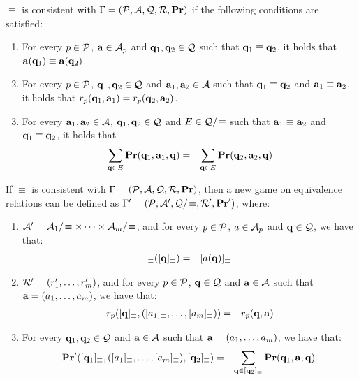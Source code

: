 \documentclass{article}
\begin{document}
\begin{mydef}
$\equiv$ is consistent with $\Gamma = (\mathcal{P},\mathcal{A},\mathcal{Q},\mathcal{R},\mathbf{Pr})$ if the following conditions are satisfied:
\begin{enumerate}
\item For every $p \in \mathcal{P}$, $\mathbf{a} \in \mathcal{A}_p$ and $\mathbf{q}_1, \mathbf{q}_2 \in \mathcal{Q}$ such that $\mathbf{q}_1 \equiv \mathbf{q}_2$, it holds that $\mathbf{a}(\mathbf{q}_1) \equiv \mathbf{a}(\mathbf{q}_2)$.

\item For every $p \in \mathcal{P}$, $\mathbf{q}_1, \mathbf{q}_2 \in \mathcal{Q}$ and $\mathbf{a}_1,\mathbf{a}_2 \in \mathcal{A}$ such that $\mathbf{q}_1 \equiv \mathbf{q}_2$ and  $\mathbf{a}_1 \equiv \mathbf{a}_2$, it holds that $r_p(\mathbf{q}_1, \mathbf{a}_1) = r_p(\mathbf{q}_2, \mathbf{a}_2)$.

\item For every $\mathbf{a}_1,\mathbf{a}_2 \in \mathcal{A}$, $\mathbf{q}_1, \mathbf{q}_2 \in \mathcal{Q}$ and $E \in \mathcal{Q}/\!\equiv$ such that $\mathbf{a}_1 \equiv \mathbf{a}_2$ and $\mathbf{q}_1 \equiv \mathbf{q}_2$, it holds that 
\begin{eqnarray*}
\sum_{\mathbf{q} \in E} \mathbf{Pr}(\mathbf{q}_1, \mathbf{a}_1, \mathbf{q}) & = & \sum_{\mathbf{q} \in E} \mathbf{Pr}(\mathbf{q}_2, \mathbf{a}_2, \mathbf{q})
\end{eqnarray*}

\end{enumerate}
\end{mydef}
If $\equiv$ is consistent with $\Gamma = (\mathcal{P},\mathcal{A},\mathcal{Q},\mathcal{R},\mathbf{Pr})$, then a new game on equivalence relations can be defined as $\Gamma' = (\mathcal{P},\mathcal{A}',\mathcal{Q}/\!\equiv,\mathcal{R}',\mathbf{Pr}')$, where:
\begin{enumerate}
\item $\mathcal{A}' = \mathcal{A}_1/\!\equiv \times \cdots \times \mathcal{A}_m/\!\equiv$, and for every $p \in \mathcal{P}$, $a \in \mathcal{A}_p$ and $\mathbf{q} \in \mathcal{Q}$, we have that:
\begin{eqnarray*}
[a]_\equiv([\bq]_\equiv) & = & [a(\bq)]_\equiv
\end{eqnarray*}

\item $\mathcal{R}' = (r'_1, \ldots, r'_m)$, and for every $p \in \mathcal{P}$, $\mathbf{q} \in \mathcal{Q}$ and $\mathbf{a} \in \mathcal{A}$ such that $\mathbf{a} = (a_1, \ldots, a_m)$, we have that:
\begin{eqnarray*}
r_p([\mathbf{q}]_\equiv, ([a_1]_\equiv, \ldots, [a_m]_\equiv)) & = & r_p(\mathbf{q}, \mathbf{a})
\end{eqnarray*}

\item For every $\mathbf{q}_1, \mathbf{q}_2 \in \mathcal{Q}$ and $\mathbf{a} \in  \mathcal{A}$ such that $\mathbf{a} = (a_1, \ldots, a_m)$, we have that:
\begin{eqnarray*}
\mathbf{Pr}'([\mathbf{q}_1]_\equiv, ([a_1]_\equiv, \ldots, [a_m]_\equiv), [\mathbf{q}_2]_\equiv) & = & \sum_{\mathbf{q} \in [\mathbf{q}_2]_\equiv} \mathbf{Pr}(\mathbf{q}_1, \mathbf{a}, \mathbf{q}).
\end{eqnarray*}
\end{enumerate}
\end{document}
